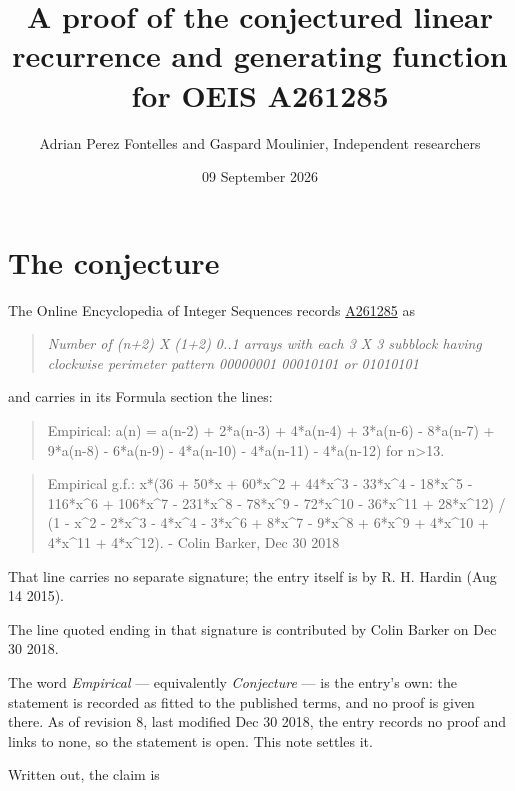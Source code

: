 \documentclass[11pt]{article}
\title{A proof of the conjectured linear recurrence and generating function for OEIS A261285}
\author{Adrian Perez Fontelles and Gaspard Moulinier, Independent researchers}
\date{09 September 2026}
\theoremstyle{definition}
\begin{document}
\maketitle
\section{The conjecture}

The Online Encyclopedia of Integer Sequences records \href{https://oeis.org/A261285}{A261285} as

\begin{quote}\itshape Number of (n+2) X (1+2) 0..1 arrays with each 3 X 3 subblock having clockwise perimeter pattern 00000001 00010101 or 01010101\end{quote}

and carries in its Formula section the lines:

\begin{quote}\ttfamily Empirical: a(n) = a(n-2) + 2*a(n-3) + 4*a(n-4) + 3*a(n-6) - 8*a(n-7) + 9*a(n-8) - 6*a(n-9) - 4*a(n-10) - 4*a(n-11) - 4*a(n-12) for n>13.\end{quote}

\begin{quote}\ttfamily Empirical g.f.: x*(36 + 50*x + 60*x\textasciicircum{}2 + 44*x\textasciicircum{}3 - 33*x\textasciicircum{}4 - 18*x\textasciicircum{}5 - 116*x\textasciicircum{}6 + 106*x\textasciicircum{}7 - 231*x\textasciicircum{}8 - 78*x\textasciicircum{}9 - 72*x\textasciicircum{}10 - 36*x\textasciicircum{}11 + 28*x\textasciicircum{}12) / (1 - x\textasciicircum{}2 - 2*x\textasciicircum{}3 - 4*x\textasciicircum{}4 - 3*x\textasciicircum{}6 + 8*x\textasciicircum{}7 - 9*x\textasciicircum{}8 + 6*x\textasciicircum{}9 + 4*x\textasciicircum{}10 + 4*x\textasciicircum{}11 + 4*x\textasciicircum{}12). - Colin Barker, Dec 30 2018\end{quote}

That line carries no separate signature; the entry itself is by R. H. Hardin (Aug 14 2015).

The line quoted ending in that signature is contributed by Colin Barker on Dec 30 2018.

The word {\itshape Empirical} --- equivalently {\itshape Conjecture} --- is the entry's own: the statement is recorded as fitted to the published terms, and no proof is given there. As of revision 8, last modified Dec 30 2018, the entry records no proof and links to none, so the statement is open. This note settles it.

Written out, the claim is
\end{document}
